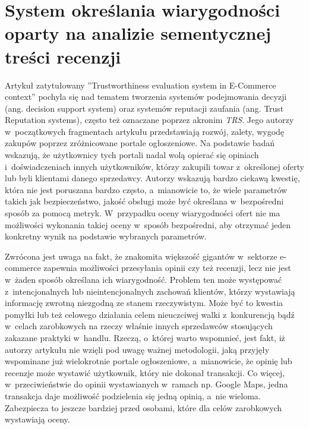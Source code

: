 \documentclass[../Kamil_Kowalewski_Main.tex]{subfiles}
\begin{document}
{    \section{System określania wiarygodności oparty na analizie sementycznej treści recenzji}
    \label{chapter2:przeglad_literatury:artykul_1} {
        Artykuł zatytułowany ''Trustworthiness evaluation system in E-Commerce
        context''\cite{article:trustworthiness_evaluation_2016} pochyla się nad tematem
        tworzenia systemów podejmowania decyzji (ang. decision support system) oraz
        systemów reputacji zaufania (ang. Trust Reputation systems), często też
        oznaczane poprzez akronim \textit{TRS}. Jego autorzy w~początkowych fragmentach
        artykułu przedstawiają rozwój, zalety, wygodę zakupów poprzez zróżnicowane
        portale ogłoszeniowe. Na podstawie badań wskazują, że użytkownicy tych portali
        nadal wolą opierać się opiniach i~doświadczeniach innych użytkowników, którzy
        zakupili towar z~określonej oferty lub byli klientami danego sprzedawcy.
        Autorzy wskazują bardzo ciekawą kwestię, która nie jest poruszana bardzo często,
        a~mianowicie to, że wiele parametrów takich jak bezpieczeństwo, jakość obsługi
        może być określana w~bezpośredni sposób za pomocą metryk. W~przypadku oceny
        wiarygodności ofert nie ma możliwości wykonania takiej oceny w~sposób
        bezpośredni, aby otrzymać jeden konkretny wynik na podstawie wybranych parametrów.

        Zwrócona jest uwaga na fakt, że znakomita większość gigantów w~sektorze
        e-commerce zapewnia możliwości przesyłania opinii czy też recenzji, lecz nie
        jest w~żaden sposób określana ich wiarygodność. Problem ten może występować
        z~intencjonalnych lub nieintencjonalnych zachowań klientów, którzy wystawiają
        informację zwrotną niezgodną ze stanem rzeczywistym. Może być to kwestia
        pomyłki lub też celowego działania celem nieuczciwej walki z~konkurencją bądź
        w~celach zarobkowych na rzeczy właśnie innych sprzedawców stosujących zakazane
        praktyki w~handlu. Rzeczą, o~której warto wspomnieć, jest fakt, iż autorzy
        artykułu nie wzięli pod uwagę ważnej metodologii, jaką przyjęły wspominane już
        wielokrotnie portale ogłoszeniowe, a~mianowicie, że opinię lub recenzje może
        wystawić użytkownik, który nie dokonał transakcji. Co więcej, w~przeciwieństwie do
        opinii wystawianych w~ramach np. Google Maps, jedna transakcja daje możliwość
        podzielenia się jedną opinią, a~nie wieloma. Zabezpiecza to jeszcze bardziej
        przed osobami, które dla celów zarobkowych wystawiają oceny.

}}
\end{document}
